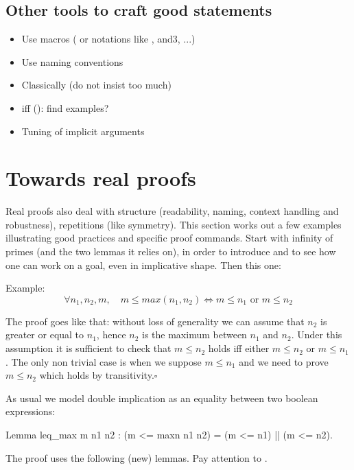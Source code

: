 \subsection{Other tools to craft good statements}

\begin{itemize}
\item Use macros ( or notations like
, and3, ...)
\item Use naming conventions
\item Classically (do not insist too much)
\item iff (): find examples?
\item Tuning of implicit arguments
\end{itemize}

\section{Towards real proofs}

Real proofs also deal with structure (readability, naming, context handling and
robustness), repetitions (like symmetry).  This section works out a few
examples illustrating good practices and specific proof
commands. Start with infinity of primes (and the two lemmas it relies
on), in order to introduce  and to see how one can work on a
goal, even in implicative shape. Then this one:

Example:
$$
\forall n_1, n_2, m, \quad m \le max(n_1,n_2)
\Leftrightarrow m \le n_1 \textrm{ or } m \le n_2
$$

The proof goes like that: without loss of generality we can assume that
$n_2$ is greater or equal to $n_1$, hence $n_2$ is the maximum between
$n_1$ and $n_2$.  Under this assumption it is sufficient to check
that $m \le n_2$ holds iff either $m \le n_2$ or $m \le n_1$.
The only non trivial case is when we suppose $m \le n_1$ and
we need to prove $m \le n_2$ which holds by transitivity.\hfill$\square$

As usual we model double implication as an equality between two
boolean expressions:

\begin{coq}{}{}
Lemma leq_max m n1 n2 : (m <= maxn n1 n2) = (m <= n1) || (m <= n2).
\end{coq}

The proof uses the following (new) lemmas.  Pay attention to
.

